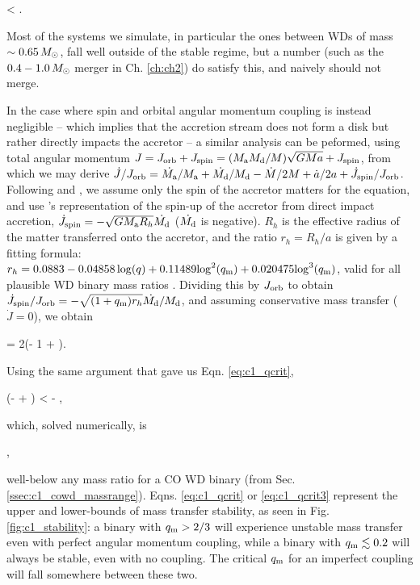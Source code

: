 \eqbegin
\qm < .
\label{eq:c1_qcrit}
\eqend

\noindent Most of the systems we simulate, in particular the ones between WDs of mass $\sim0.65\,\Msun$, fall well outside of the stable regime, but a number (such as the $0.4 - 1.0\,\Msun$ merger in Ch. \ref{ch:ch2}) do satisfy this, and naively should not merge.

In the case where spin and orbital angular momentum coupling is instead negligible -- which implies that the accretion stream does not form a disk but rather directly impacts the accretor \citep{nele+01} -- a similar analysis can be peformed, using total angular momentum $J = J_\mrm{orb} + J_\mrm{spin} = (\Ma\Md/M)\sqrt{GMa} + J_\mrm{spin}$, from which we may derive $\dot{J}/J_\mrm{orb} = \dot{\Ma}/\Ma + \dot{\Md}/\Md - \dot{M}/2M + \dot{a}/2a + \dot{J}_\mrm{spin}/J_\mrm{orb}$.  Following \cite{marsns04} and \cite{nele+01}, we assume only the spin of the accretor matters for the equation, and use \cite{verbr88}'s representation of the spin-up of the accretor from direct impact accretion, $\dot{J}_\mrm{spin} = -\sqrt{G\Ma R_h}\dot{\Md}$ ($\dot{\Md}$ is negative).  $R_h$ is the effective radius of the matter transferred onto the accretor, and the ratio $r_h = R_h/a$ is given by a fitting formula: $r_h = 0.0883 - 0.04858\log({q}) + 0.11489{\log}^2(\qm) + 0.020475{\log}^3(\qm)$, valid for all plausible WD binary mass ratios \citep{verbr88}.  Dividing this by $J_\mathrm{orb}$ to obtain $\dot{J}_\mrm{spin}/J_\mrm{orb} = -\sqrt{(1 + \qm)r_h}\dot{\Md}/\Md$, and assuming conservative mass transfer ($\dot{J} = 0$), we obtain \citep{marsns04,nele+01}

\eqbegin
{} = 2\left(\qm- 1 + \right)\frac{\dot{\Md}}{\Md}.
\label{eq:c1_adotovera2}
\eqend

\noindent Using the same argument that gave us Eqn. \ref{eq:c1_qcrit},

\left(\qm-  + \right) < - ,
\label{eq:c1_qcrit2}
\eqend

\noindent which, solved numerically, is

\eqbegin
\qm{},
\label{eq:c1_qcrit3}
\eqend

\noindent well-below any mass ratio for a CO WD binary (from Sec. \ref{ssec:c1_cowd_massrange}).  Eqns. \ref{eq:c1_qcrit} or \ref{eq:c1_qcrit3} represent the upper and lower-bounds of mass transfer stability, as seen in Fig. \ref{fig:c1_stability}: a binary with $\qm > 2/3$ will experience unstable mass transfer even with perfect angular momentum coupling, while a binary with $\qm \lesssim 0.2$ will always be stable, even with no coupling.  The critical $\qm$ for an imperfect coupling will fall somewhere between these two.

